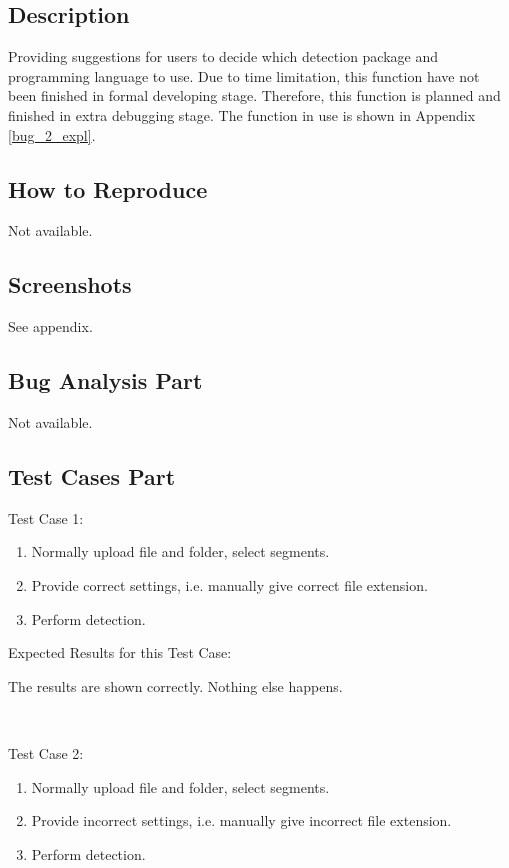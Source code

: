 \documentclass[twoside,a4paper]{refart}
\begin{document}
\subsection*{Description}
Providing suggestions for users to decide which detection package and programming language to use. Due to time limitation, this function have not been finished in formal developing stage. Therefore, this function is planned and finished in extra debugging stage. The function in use is shown in Appendix \ref{bug_2_expl}.

\subsection*{How to Reproduce}
Not available.

\subsection*{Screenshots}
See appendix.

\subsection{Bug Analysis Part}
Not available.

\subsection{Test Cases Part}
Test Case 1:

\begin{enumerate}
\item Normally upload file and folder, select segments.
\item Provide correct settings, i.e. manually give correct file extension.
\item Perform detection.
\end{enumerate}

Expected Results for this Test Case: 

The results are shown correctly. Nothing else happens.

$\ $

Test Case 2:

\begin{enumerate}
\item Normally upload file and folder, select segments.
\item Provide incorrect settings, i.e. manually give incorrect file extension.
\item Perform detection.
\end{enumerate}
\end{document}
